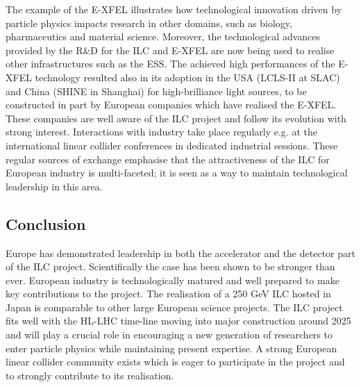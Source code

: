 \documentclass[%
 reprint,
 floatfix,
 amsmath,amssymb,
 aps,
]{revtex4-1}
\begin{document}
The example of the E-XFEL illustrates how technological innovation driven by particle physics impacts research in other domains, such as biology, pharmaceutics and material science. Moreover, the technological advances provided by the R\&D for the ILC and E-XFEL are now being used to realise other infrastructures such as the ESS.
The achieved high performances of the E-XFEL technology resulted also in its adoption in the USA (LCLS-II at SLAC) and China (SHINE in Shanghai) for high-brilliance light sources, to be constructed in part by European companies which have realised the E-XFEL. These companies are well aware of the ILC project and follow its evolution with strong interest. Interactions with industry take place regularly e.g. at the international linear collider conferences in dedicated industrial sessions. These regular sources of exchange emphasise that the attractiveness of the ILC for European industry is multi-faceted; 
it is seen as a way to maintain technological leadership in this area. 

\subsection{Conclusion}
Europe has demonstrated leadership in both the accelerator and the detector part of the ILC project. Scientifically the case has been shown to be stronger than ever. European industry is technologically matured and well prepared to make key contributions to the project. The realisation of a 250 GeV ILC hosted in Japan is comparable to other large European science projects. The ILC project fits well with the HL-LHC time-line moving into major construction around 2025 and will play a crucial role in encouraging a new generation of researchers to enter particle physics while maintaining present expertise. A strong European linear collider community exists which is eager to participate in the project and to strongly contribute to its realisation. 







\onecolumngrid
\newpage
\end{document}
